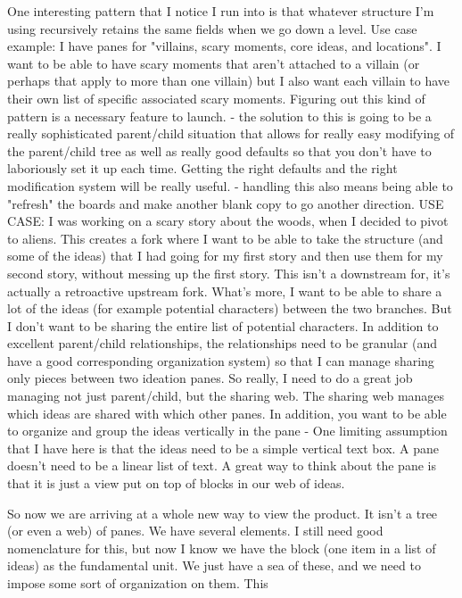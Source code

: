 One interesting pattern that I notice I run into is that whatever structure I'm using recursively retains the same fields when we go down a level. Use case example: I have panes for "villains, scary moments, core ideas, and locations". I want to be able to have scary moments that aren't attached to a villain (or perhaps that apply to more than one villain) but I also want each villain to have their own list of specific associated scary moments. Figuring out this kind of pattern is a necessary feature to launch.
- the solution to this is going to be a really sophisticated parent/child situation that allows for really easy modifying of the parent/child tree as well as really good defaults so that you don't have to laboriously set it up each time. Getting the right defaults and the right modification system will be really useful.
- handling this also means being able to "refresh" the boards and make another blank copy to go another direction. USE CASE: I was working on a scary story about the woods, when I decided to pivot to aliens. This creates a fork where I want to be able to take the structure (and some of the ideas) that I had going for my first story and then use them for my second story, without messing up the first story. This isn't a downstream for, it's actually a retroactive upstream fork. What's more, I want to be able to share a lot of the ideas (for example potential characters) between the two branches. But I don't want to be sharing the entire list of potential characters. In addition to excellent parent/child relationships, the relationships need to be granular (and have a good corresponding organization system) so that I can manage sharing only pieces between two ideation panes. So really, I need to do a great job managing not just parent/child, but the sharing web. The sharing web manages which ideas are shared with which other panes. In addition, you want to be able to organize and group the ideas vertically in the pane
- One limiting assumption that I have here is that the ideas need to be a simple vertical text box. A pane doesn't need to be a linear list of text. A great way to think about the pane is that it is just a view put on top of blocks in our web of ideas.

So now we are arriving at a whole new way to view the product. It isn't a tree (or even a web) of panes. We have several elements. I still need good nomenclature for this, but now I know we have the block (one item in a list of ideas) as the fundamental unit. We just have a sea of these, and we need to impose some sort of organization on them.  This 
